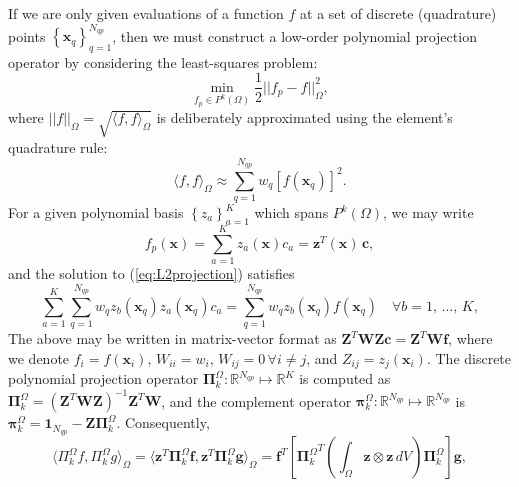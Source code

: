 	If we are only given evaluations of a function $f$ at a set of discrete (quadrature) points $\left\{ \mathbf{x}_q \right\}_{q=1}^{N_{qp}}$, then we must construct a low-order polynomial projection operator by considering the least-squares problem:
	\begin{equation}
		\min_{f_p \in P^k (\Omega)} \frac{1}{2} || f_p - f ||^2_\Omega,
	\end{equation}
	where $|| f ||_\Omega = \sqrt{\langle f, f \rangle_\Omega}$ is deliberately approximated using the element's quadrature rule:
	\begin{equation}
		\langle f, f \rangle_\Omega \approx \sum_{q=1}^{N_{qp}} w_q \left[ f(\mathbf{x}_q) \right]^2.
		\label{eq:L2projection}
	\end{equation}
	For a given polynomial basis $\left\{ z_a \right\}_{a=1}^{K}$ which spans $P^k (\Omega)$, we may write
	\begin{equation}
		f_p (\mathbf{x}) = \sum_{a=1}^{K} z_a (\mathbf{x}) c_a = \mathbf{z}^T (\mathbf{x}) \, \mathbf{c},
	\end{equation}
	and the solution to (\ref{eq:L2projection}) satisfies
	\begin{equation}
		\sum_{a=1}^{K} \sum_{q=1}^{N_{qp}} w_q z_b (\mathbf{x}_q) z_a (\mathbf{x}_q) c_a =
		\sum_{q=1}^{N_{qp}} w_q z_b (\mathbf{x}_q) f(\mathbf{x}_q) \quad \forall b = 1, \, \ldots, \, K,
	\end{equation}
	The above may be written in matrix-vector format as $\mathbf{Z}^T \mathbf{W} \mathbf{Z} \mathbf{c} = \mathbf{Z}^T \mathbf{W} \mathbf{f}$, where we denote $f_i = f(\mathbf{x}_i)$, $W_{ii} = w_i, \, W_{ij} = 0 \, \forall i \neq j$, and $Z_{ij} = z_j (\mathbf{x}_i)$. The discrete polynomial projection operator $\mathbf{\Pi}^{\Omega}_k : \mathbb{R}^{N_{qp}} \mapsto \mathbb{R}^K$ is computed as $\boldsymbol{\Pi}^{\Omega}_k = (\mathbf{Z}^T \mathbf{W} \mathbf{Z})^{-1} \mathbf{Z}^T \mathbf{W}$, and the complement operator $\boldsymbol{\pi}^{\Omega}_k : \mathbb{R}^{N_{qp}} \mapsto \mathbb{R}^{N_{qp}}$ is $\boldsymbol{\pi}^{\Omega}_k = \mathbf{1}_{N_{qp}} - \mathbf{Z} \boldsymbol{\Pi}^{\Omega}_k$. Consequently,
	\begin{equation}
		\langle \Pi^{\Omega}_k f, \Pi^{\Omega}_k g \rangle_{\Omega} = \langle \mathbf{z}^T \boldsymbol{\Pi}^{\Omega}_k \mathbf{f}, \mathbf{z}^T \boldsymbol{\Pi}^{\Omega}_k \mathbf{g} \rangle_{\Omega} = \mathbf{f}^T \left[ {\boldsymbol{\Pi}^{\Omega}_k}^T \left( \int_{\Omega} \mathbf{z} \otimes \mathbf{z} \, dV \right) \boldsymbol{\Pi}^{\Omega}_k \right] \mathbf{g},
	\end{equation}
